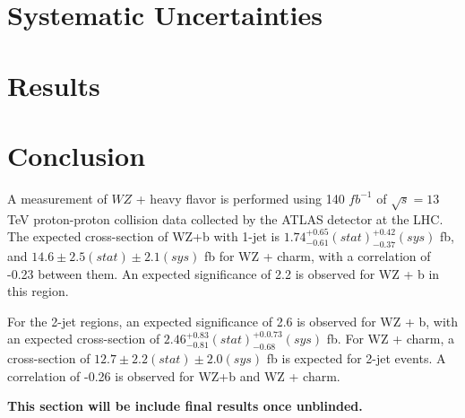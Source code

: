 \documentclass[NOTE, atlasdraft=true, texlive=2016, UKenglish]{\ATLASLATEXPATH atlasdoc}
\begin{document}
\section{Systematic Uncertainties}
\label{sec:sys}


\section{Results}
\label{sec:results}



\section{Conclusion}
\label{sec:conclusion}

A measurement of $WZ$ + heavy flavor is performed using 140 $fb^{-1}$ of $\sqrt{s} = 13$ TeV proton-proton collision data collected by the ATLAS detector at the LHC. The expected cross-section of WZ+b with 1-jet is $1.74^{+0.65}_{-0.61}(stat)^{+0.42}_{-0.37}(sys)$ fb, and $14.6 \pm 2.5 (stat) \pm 2.1 (sys)$ fb for WZ + charm, with a correlation of -0.23 between them. An expected significance of 2.2 is observed for WZ + b in this region.

For the 2-jet regions, an expected significance of 2.6 is observed for WZ + b, with an expected cross-section of $2.46^{+0.83}_{-0.81}(stat)^{+0.0.73}_{-0.68}(sys)$ fb. For WZ + charm, a cross-section of $12.7 \pm 2.2 (stat) \pm 2.0 (sys)$ fb is expected for 2-jet events. A correlation of -0.26 is observed for WZ+b and WZ + charm.

\textbf{This section will be include final results once unblinded.}%

%
%
\end{document}
